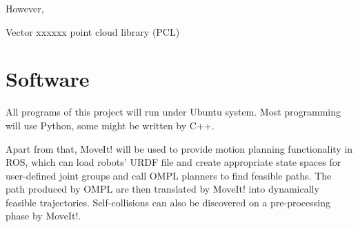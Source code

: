 However, 

Vector xxxxxx 
point cloud library (PCL)

\section{Software}
All programs of this project will run under Ubuntu system. Most programming will use Python, some might be written by C++.

Apart from that, MoveIt! will be used to provide motion planning functionality in ROS, which can load robots' URDF file and create appropriate state spaces for user-defined joint groups and call OMPL planners to find feasible paths. The path produced by OMPL are then translated by MoveIt! into dynamically feasible trajectories. Self-collisions can also be discovered on a pre-processing phase by MoveIt!. 

